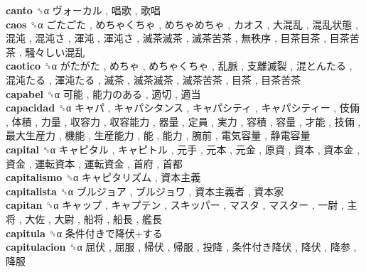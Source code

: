 \textbf{canto} ␝α   ヴォーカル ,  唱歌 ,  歌唱   \\
\textbf{caos} ␝α   ごたごた ,  めちゃくちゃ ,  めちゃめちゃ ,  カオス ,  大混乱 ,  混乱状態 ,  混沌 ,  混沌さ ,  渾沌 ,  渾沌さ ,  滅茶滅茶 ,  滅茶苦茶 ,  無秩序 ,  目茶目茶 ,  目茶苦茶 ,  騒々しい混乱   \\
\textbf{caotico} ␝α   がたがた ,  めちゃ ,  めちゃくちゃ ,  乱脈 ,  支離滅裂 ,  混とんたる ,  混沌たる ,  渾沌たる ,  滅茶 ,  滅茶滅茶 ,  滅茶苦茶 ,  目茶 ,  目茶苦茶   \\
\textbf{capabel} ␝α   可能 ,  能力のある ,  適切 ,  適当   \\
\textbf{capacidad} ␝α   キャパ ,  キャパシタンス ,  キャパシティ ,  キャパシティー ,  伎倆 ,  体積 ,  力量 ,  収容力 ,  収容能力 ,  器量 ,  定員 ,  実力 ,  容積 ,  容量 ,  才能 ,  技倆 ,  最大生産力 ,  機能 ,  生産能力 ,  能 ,  能力 ,  腕前 ,  電気容量 ,  静電容量   \\
\textbf{capital} ␝α   キャピタル ,  キャピトル ,  元手 ,  元本 ,  元金 ,  原資 ,  資本 ,  資本金 ,  資金 ,  運転資本 ,  運転資金 ,  首府 ,  首都   \\
\textbf{capitalismo} ␝α   キャピタリズム ,  資本主義   \\
\textbf{capitalista} ␝α   ブルジョア ,  ブルジョワ ,  資本主義者 ,  資本家   \\
\textbf{capitan} ␝α   キャップ ,  キャプテン ,  スキッパー ,  マスタ ,  マスター ,  一尉 ,  主将 ,  大佐 ,  大尉 ,  船将 ,  船長 ,  艦長   \\
\textbf{capitula} ␝α   条件付きで降伏+する   \\
\textbf{capitulacion} ␝α   屈伏 ,  屈服 ,  帰伏 ,  帰服 ,  投降 ,  条件付き降伏 ,  降伏 ,  降参 ,  降服   \\
